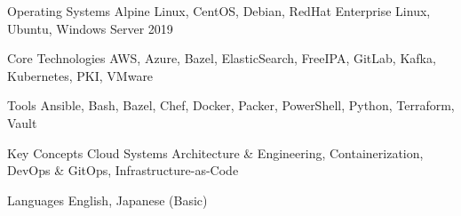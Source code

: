 \begin{cvskills}


\cvskill
{Operating Systems} %
{ %
 Alpine Linux,
 CentOS,
 Debian,
 RedHat Enterprise Linux,
 Ubuntu,
 Windows Server 2019
}


\cvskill
{Core Technologies} %
{ %
 AWS,
 Azure,
 Bazel,
 ElasticSearch,
 FreeIPA,
 GitLab,
 Kafka,
 Kubernetes,
 PKI,
 VMware
}


\cvskill
{Tools} %
{ %
 Ansible,
 Bash,
 Bazel,
 Chef,
 Docker,
 Packer,
 PowerShell,
 Python,
 Terraform,
 Vault
}


\cvskill
{Key Concepts} %
{ %
 Cloud Systems Architecture \& Engineering,
 Containerization,
 DevOps \& GitOps,
 Infrastructure-as-Code
}



\cvskill
{Languages} %
{English, Japanese (Basic)} %


\end{cvskills}
